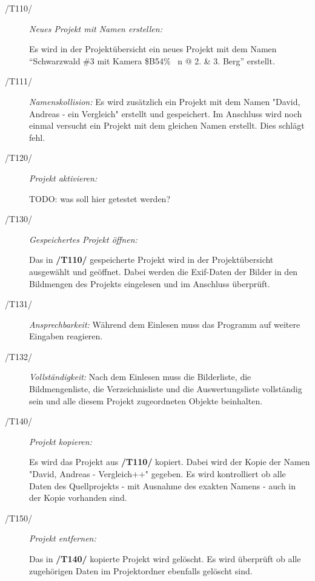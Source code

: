 		\begin{description}
		
			\item[/T110/] \textit{Neues Projekt mit Namen erstellen:}\par Es wird in der Projektübersicht ein neues Projekt mit dem Namen "`Schwarzwald \#3 mit Kamera \$B54\% ~n @ 2. \& 3. Berg"' erstellt.
			\item[/T111/] \textit{Namenskollision: }Es wird zusätzlich ein Projekt mit dem Namen "David, Andreas - ein Vergleich" erstellt und gespeichert. Im Anschluss wird noch einmal versucht ein Projekt mit dem gleichen Namen erstellt. Dies schlägt fehl.
				
			\item[/T120/] \textit{Projekt aktivieren:}\par TODO: was soll hier getestet werden?
				
			\item[/T130/] \textit{Gespeichertes Projekt öffnen:}\par Das in \textbf{/T110/} gespeicherte Projekt wird in der Projektübersicht ausgewählt und geöffnet. Dabei werden die Exif-Daten der Bilder in den Bildmengen des Projekts eingelesen und im Anschluss überprüft.

			\item[/T131/] \textit{Ansprechbarkeit:}	Während dem Einlesen muss das Programm auf weitere Eingaben reagieren.
			
			\item[/T132/] \textit{Vollständigkeit:} Nach dem Einlesen muss die Bilderliste, die Bildmengenliste, die Verzeichnisliste und die Auswertungsliste vollständig sein und alle diesem Projekt zugeordneten Objekte beinhalten.
			
			\item[/T140/] \textit{Projekt kopieren:}\par Es wird das Projekt aus \textbf{/T110/} kopiert. Dabei wird der Kopie der Namen "David, Andreas - Vergleich++" gegeben. Es wird kontrolliert ob alle Daten des Quellprojekts - mit Ausnahme des exakten Namens - auch in der Kopie vorhanden sind.
				
			\item[/T150/] \textit{Projekt entfernen:}\par Das in \textbf{/T140/} kopierte Projekt wird gelöscht. Es wird überprüft ob alle zugehörigen Daten im Projektordner ebenfalls gelöscht sind.
		
		\end{description}
	
